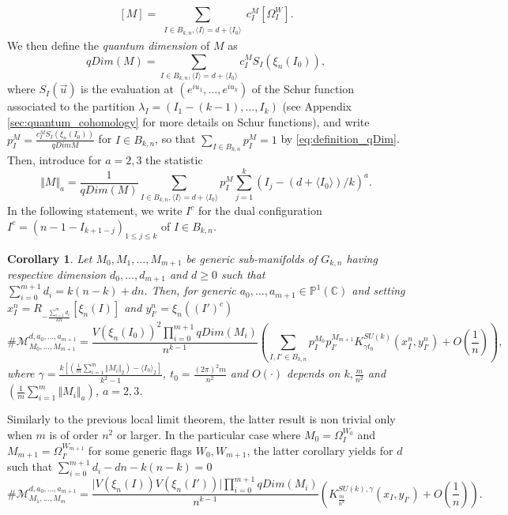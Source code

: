 \documentclass[10pt,11pt]{amsart}%
\newtheorem{corollary}[theorem]{Corollary}
\begin{document}
$$[M]=\sum_{\substack{I\in B_{k,n}, \langle I\rangle=d+\langle I_0\rangle}}c_I^M\left[\Omega_{I}^W\right].$$ 
We then define the \textit{quantum dimension} of $M$ as 
\begin{equation}\label{eq:definition_qDim}
qDim(M)=\sum_{I\in B_{k,n}, \langle I\rangle=d+\langle I_0\rangle}c_I^MS_I(\xi_{n}(I_0)),
\end{equation}
where $S_I(\vec{u})$ is the evaluation at $(e^{iu_1},\ldots,e^{iu_k})$ of the Schur function associated to the partition $\lambda_I=(I_1-(k-1),\ldots ,I_k)$ (see Appendix \ref{sec:quantum_cohomology} for more details on Schur functions), and write $p_{I}^M=\frac{c^{M}_IS_{I}(\xi_n(I_0))}{qDim M}$ for $I\in B_{k,n}$, so that $\sum_{I\in B_{k,n}}p_{I}^M=1$ by \eqref{eq:definition_qDim}. Then, introduce for $a=2,3$ the statistic
$$\Vert M\Vert_a= \frac{1}{qDim(M)}\sum_{I\in B_{k,n}, \langle I\rangle=d+\langle I_0\rangle}p_I^M\sum_{j=1}^k(I_j-(d+\langle I_0\rangle)/k)^a.$$
In the following statement, we write $I^c$ for the dual configuration $I^c=(n-1-I_{k+1-j})_{1\leq j\leq k}$ of $I\in B_{k,n}$.
\begin{corollary}\label{cor:cohomology}
Let $M_0,M_1,\ldots, M_{m+1}$ be generic sub-manifolds of $G_{k,n}$ having respective dimension $d_0,\ldots,d_{m+1}$ and $d\geq 0$ such that $\sum_{i=0}^{m+1}d_i=k(n-k)+dn$. Then, for generic $a_0,\ldots,a_{m+1}\in \mathbb{P}^1(\mathbb{C})$ and setting $ x^n_I=R_{-\frac{\sum_{i=1}^md_i}{kn}}\left[\xi_n(I)\right]$ and $y^n_{I'}=\xi_n((I')^c)$
$$\#\mathcal{M}^{d,a_0,\ldots,a_{m+1}}_{M_0,\ldots,M_{m+1}}=\frac{V(\xi_{n}(I_0))^2\prod_{i=0}^{m+1}qDim(M_i)}{n^{k-1}}\left(\sum_{I,I'\in B_{k,n}}p_I^{M_0}p_{I'}^{M_{m+1}}K_{\gamma t_0}^{SU(k)}\left(x^n_I,y^n_{I'}\right)+O\left(\frac{1}{n}\right)\right),$$
where $\gamma=\frac{k\left[\left(\frac{1}{m}\sum_{i=1}^m\Vert M_i\Vert_2 \right)-\langle I_0\rangle_2\right]}{k^2-1}$, $t_0=\frac{(2\pi)^2m}{n^2}$ and $O(\cdot)$ depends on $k, \frac{m}{n^2}$ and $\left(\frac{1}{m}\sum_{i=1}^m\Vert M_i\Vert_a \right)$, $a=2,3$.
\end{corollary}
Similarly to the previous local limit theorem, the latter result is non trivial only when $m$ is of order $n^2$ or larger. In the particular case where $M_0=\Omega^{W_0}_I$ and $M_{m+1}=\Omega^{W_{m+1}}_{I'}$ for some generic flags $W_0,W_{m+1}$, the latter corollary yields for $d$ such that $\sum_{i=0}^{m+1}d_i-dn-k(n-k)=0$
$$\#\mathcal{M}^{d,a_0,\ldots,a_{m+1}}_{M_1,\ldots,M_m}=\frac{\vert V(\xi_{n}(I))V(\xi_{n}(I'))\vert\prod_{i=0}^{m+1}qDim(M_i)}{n^{k-1}}\left(K_{\frac{m}{n^2}}^{SU(k),\gamma}\left(x_I,y_{I'}\right)+O\left(\frac{1}{n}\right)\right).$$
\end{document}
